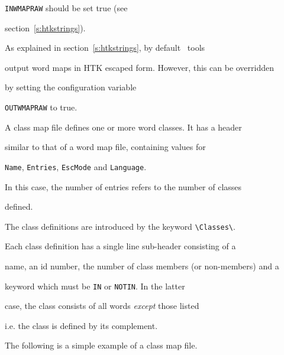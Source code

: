 \texttt{INWMAPRAW} should be set true (see


section~\ref{s:htkstrings}).





As explained in section~\ref{s:htkstrings}, by default \HTK\ tools


output word maps in HTK escaped form.  However, this can be overridden


by setting the  configuration variable


\texttt{OUTWMAPRAW} to true.










A class map file defines one or more word classes.  It has a header


similar to that of a word map file, containing values for


\texttt{Name}, \texttt{Entries}, \texttt{EscMode} and \texttt{Language}.  


In this case, the number of entries refers to the number of classes


defined.  





The class definitions are introduced by the keyword \verb+\Classes\+.


Each class definition has a single line sub-header consisting of a


name, an id number, the number of class members (or non-members) and a


keyword which must be \texttt{IN} or \texttt{NOTIN}.  In the latter


case, the class consists of all words \textit{except} those listed


i.e. the class is defined by its complement. 





The following is a simple example  of a class map file.


